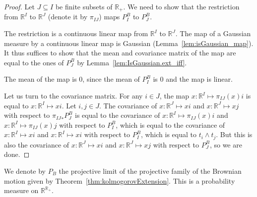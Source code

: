 \begin{proof}\leanok
Let $J \subseteq I$ be finite subsets of $\mathbb{R}_+$.
We need to show that the restriction from $\mathbb{R}^I$ to $\mathbb{R}^J$ (denote it by $\pi_{IJ}$) maps $P^B_I$ to $P^B_J$.

The restriction is a continuous linear map from $\mathbb{R}^I$ to $\mathbb{R}^J$.
The map of a Gaussian measure by a continuous linear map is Gaussian (Lemma~\ref{lem:isGaussian_map}).
It thus suffices to show that the mean and covariance matrix of the map are equal to the ones of $P^B_J$ by Lemma~\ref{lem:IsGaussian.ext_iff}.

The mean of the map is $0$, since the mean of $P^B_I$ is $0$ and the map is linear.

Let us turn to the covariance matrix. For any $i \in J$, the map $x : \mathbb{R}^I \mapsto \pi_{IJ}(x) i$ is equal to $x : \mathbb{R}^I \mapsto x i$. Let $i, j \in J$. The covariance of $x : \mathbb{R}^J \mapsto x i$ and $x : \mathbb{R}^J \mapsto x j$ with respect to ${\pi_{IJ}}_*P^B_J$ is equal to the covariance of $x : \mathbb{R}^I \mapsto \pi_{IJ}(x) i$ and $x : \mathbb{R}^I \mapsto \pi_{IJ}(x) j$ with respect to $P^B_I$, which is equal to the covariance of $x : \mathbb{R}^I \mapsto x i$ and $x : \mathbb{R}^I \mapsto x i$ with respect to $P^B_I$, which is equal to $t_i \land t_j$. But this is also the covariance of $x : \mathbb{R}^J \mapsto x i$ and $x : \mathbb{R}^J \mapsto x j$ with respect to $P^B_J$, so we are done.
\end{proof}


\begin{definition}\label{def:gaussianLimit}
  \leanok
We denote by $P_B$ the projective limit of the projective family of the Brownian motion given by Theorem~\ref{thm:kolmogorovExtension}.
This is a probability measure on $\mathbb{R}^{\mathbb{R}_+}$.
\end{definition}
